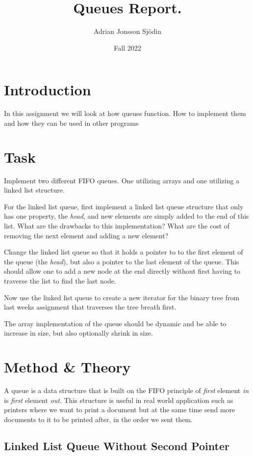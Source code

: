 \documentclass[a4paper,11pt]{article}
\begin{document}
\title{
    \textbf{Queues Report.}
}
\author{Adrian Jonsson Sjödin}
\date{Fall 2022}

\maketitle

\section{Introduction}
\label{intro}
In this assignment we will look at how queues function. How to implement them and how they
can be used in other programs

\section{Task}
\label{task}
Implement two different FIFO queues. One utilizing arrays and one utilizing a linked list structure.

For the linked list queue, first implement a linked list queue structure that only has one property,
the \textit{head}, and new elements are simply added to the end of this list. What are the drawbacks
to this implementation? What are the cost of removing the next element and adding a new element?

Change the linked list queue so that it holds a pointer to to the first element of the queue
(the \textit{head}), but also a pointer to the last element of the queue. This should allow one
to add a new node at the end directly without first having to traverse the list to find the last
node.

Now use the linked list queue to create a new iterator for the binary tree from last weeks assignment
that traverses the tree breath first.

The array implementation of the queue  should be dynamic and be able to increase in size, but also
optionally shrink in size.
\section{Method \& Theory}
\label{method}
A queue is a data structure that is built on the FIFO principle of \textit{first} element \textit{in} is \textit{first}
element \textit{out}. This structure is useful in real world application such as printers where we want to print a document but
at the same time send more documents to it to be printed after, in the order we sent them.
\subsection{Linked List Queue Without Second Pointer}
\label{met-linkedQueueNoLast}
\end{document}
